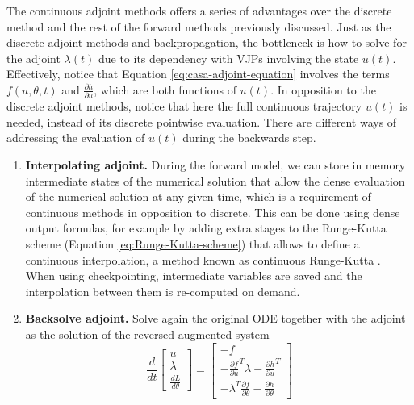 The continuous adjoint methods offers a series of advantages over the discrete method and the rest of the forward methods previously discussed. 
Just as the discrete adjoint methods and backpropagation, the bottleneck is how to solve for the adjoint $\lambda(t)$ due to its dependency with VJPs involving the state $u(t)$.
Effectively, notice that Equation \eqref{eq:casa-adjoint-equation} involves the terms $f(u, \theta, t)$ and $\frac{\partial h}{\partial u}$, which are both functions of $u(t)$. 
In opposition to the discrete adjoint methods, notice that here the full continuous trajectory $u(t)$ is needed, instead of its discrete pointwise evaluation. 
There are different ways of addressing the evaluation of $u(t)$ during the backwards step.
\begin{enumerate}[label=(\roman*)]
    \item \textbf{Interpolating adjoint.} During the forward model, we can store in memory intermediate states of the numerical solution that allow the dense evaluation of the numerical solution at any given time, which is a requirement of continuous methods in opposition to discrete. 
    This can be done using dense output formulas, for example by adding extra stages to the Runge-Kutta scheme (Equation \eqref{eq:Runge-Kutta-scheme}) that allows to define a continuous interpolation, a method known as continuous Runge-Kutta \cite{hairer-solving-2, Alexe_Sandu_2009}. 
    When using checkpointing, intermediate variables are saved and the interpolation between them is re-computed on demand. 
    \item \textbf{Backsolve adjoint.} Solve again the original ODE together with the adjoint as the solution of the reversed augmented system \cite{chen_neural_2019}
    \begin{equation}
    \frac{d}{dt}
    \begin{bmatrix}
       u \\
       \lambda \\
       \frac{dL}{d\theta}
    \end{bmatrix}
    = 
    \begin{bmatrix}
       -f \\
       - \frac{\partial f}{\partial u}^T \lambda - \frac{\partial h}{\partial u}^T \\
       - \lambda^T \frac{\partial f}{\partial \theta} - \frac{\partial h}{\partial \theta}

\end{bmatrix}
\end{equation}
\end{enumerate}
